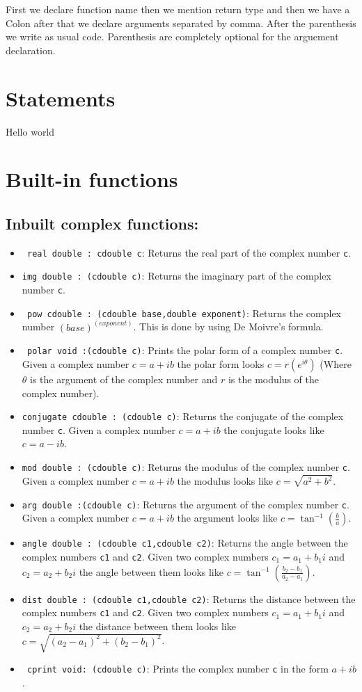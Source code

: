 \documentclass[12pt]{article}
\begin{document}
First we declare function name then we mention return type and then we have a Colon after that we declare arguments separated by comma. After the parenthesis we write as usual code. Parenthesis are completely optional for the arguement declaration.


\section{Statements}
Hello world 
\section{Built-in functions}
\subsection{Inbuilt complex functions:}
\begin{itemize}
    \item \texttt{ real double : cdouble c}: Returns the real part of the complex number \texttt{c}.
    \item \texttt{img double : (cdouble c)}: Returns the imaginary part of the complex number \texttt{c}.
    \item \texttt{ pow cdouble : (cdouble base,double exponent)}: Returns the complex number ${(base)}^{(exponent)}$. This is done by using De Moivre's formula.
    \item \texttt{ polar void :(cdouble c)}: Prints the polar form of a complex number \texttt{c}. Given a complex number $c=a+ib$ the polar form looks $c=r(e^{i \theta })$ (Where $\theta$ is the argument of the complex number and $r$ is the modulus of the complex number).
    \item \texttt{conjugate cdouble : (cdouble c)}: Returns the conjugate of the complex number \texttt{c}. Given a complex number $c=a+ib$ the conjugate looks like $c=a-ib$.
    \item  \texttt{mod double : (cdouble c)}: Returns the modulus of the complex number \texttt{c}. Given a complex number $c=a+ib$ the modulus looks like $c=\sqrt{a^2+b^2}$.
    \item \texttt{arg double :(cdouble c)}: Returns the argument of the complex number \texttt{c}. Given a complex number $c=a+ib$ the argument looks like $c=\tan^{-1}(\frac{b}{a})$.
    \item  \texttt{angle double : (cdouble c1,cdouble c2)}: Returns the angle between the complex numbers \texttt{c1} and \texttt{c2}. Given two complex numbers $c_1=a_1+b_1i$ and $c_2=a_2+b_2i$ the angle between them looks like $c=\tan^{-1}(\frac{b_2-b_1}{a_2-a_1})$.
    \item \texttt{dist double : (cdouble c1,cdouble c2)}: Returns the distance between the complex numbers \texttt{c1} and \texttt{c2}. Given two complex numbers $c_1=a_1+b_1i$ and $c_2=a_2+b_2i$ the distance between them looks like $c=\sqrt{(a_2-a_1)^2+(b_2-b_1)^2}$.
    \item \texttt{ cprint void: (cdouble c)}: Prints the complex number \texttt{c} in the form $a+ib$.
\end{itemize}
\end{document}
